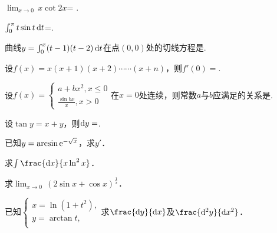 \documentclass[plain,noanswer,medmath]{../../template/jnuexam}
\begin{document}






\begin{problem}
$\lim_{x\to 0}\,x\cot 2x$= \fillin{}.
\end{problem}


\begin{problem}
$\int_0^{\pi}t\sin t\mathop{}\!\mathrm{d} t$=\fillin{}.
\end{problem}


\begin{problem}
曲线$y=\int_0^x (t-1)(t-2)\mathop{}\!\mathrm{d} t$在点$(0,0)$处的切线方程是\fillin{}.
\end{problem}


\begin{problem}
设$f(x)=x(x+1)(x+2)\cdots \cdots(x+n)$，则$f'(0)=$\fillin{}.
\end{problem}




\begin{problem}
设$f(x)=\begin{cases}
  a+bx^2,x\le 0 \\
  \frac{\sin bx}{x},x>0
\end{cases}$在$x=0$处连续，则常数$a$与$b$应满足的关系是\fillin{}.
\end{problem}


\begin{problem}
设$\tan y=x+y$，则$\mathop{}\!\mathrm{d} y=$\fillin{}.
\end{problem}




\begin{problem}
已知$y=\arcsin\mathrm{e}^{-\sqrt{x}}$，求$y'$．
\end{problem}


\begin{problem}
求$\int \frac{\dx}{x\ln^2 x}$．
\end{problem}


\begin{problem}
求$\lim_{x\to 0}\,(2\sin x+\cos x)^{\frac{1}{x}}$．
\end{problem}


\begin{problem}
已知$\begin{cases}
  x=\ln(1+t^2), \\
  y=\arctan t, \\
\end{cases}$求$\frac{\dy}{\dx}$及$\frac{\d^2y}{\dx^2}$．
\end{problem}
\end{document}
